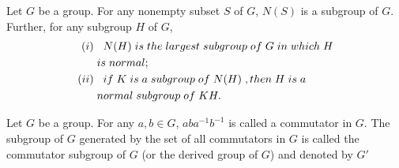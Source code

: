 \begin{teo}
    Let $G$ be a group. For any nonempty subset $S$ of $G$, $N(S)$ is a subgroup of $G$. Further, for any subgroup $H$ of $G$,
    \begin{align*}
    (i)&\hspace{.3cm}N(H)\hspace{.1cm}is\hspace{.1cm}the\hspace{.1cm}largest\hspace{.1cm}subgroup\hspace{.1cm}of\hspace{.1cm}G\hspace{.1cm}in\hspace{.1cm}which\hspace{.1cm}H\\
    &\hspace{.1cm}is\hspace{.1cm}normal;\\
    (ii)&\hspace{.3cm}if\hspace{.1cm}K\hspace{.1cm}is\hspace{.1cm}a\hspace{.1cm}subgroup\hspace{.1cm}of\hspace{.1cm}N(H)\hspace{.1cm},then\hspace{.1cm}H\hspace{.1cm}is\hspace{.1cm}a\\&\hspace{.1cm}normal\hspace{.1cm}subgroup\hspace{.1cm}of\hspace{.1cm}KH.
\end{align*}
\end{teo}
\begin{defi}
    Let $G$ be a group. For any $a,b\in G$, $aba^{-1}b^{-1}$ is called a commutator in $G$. The subgroup of $G$ generated by the set of all commutators in $G$ is called the commutator subgroup of $   G$ (or the derived group of $G$) and denoted by $G'$
\end{defi}
